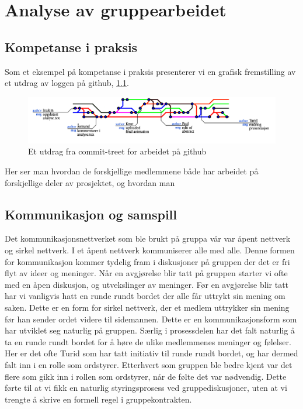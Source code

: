 
\chapter{Analyse av gruppearbeidet}

\section{Kompetanse i praksis}

Som et eksempel på kompetanse i praksis presenterer vi en grafisk fremstilling
av et utdrag av loggen på github, \cref{fig:github}.
\begin{figure}[h!]
  \begin{center}
    \includegraphics[width=\textwidth]{github.png}
  \end{center}
  \caption{Et utdrag fra commit-treet for arbeidet på github}
  \label{fig:github}
\end{figure}
Her ser man hvordan de forskjellige medlemmene både har arbeidet på forskjellige
deler av prosjektet, og hvordan man 


\section{Kommunikasjon og samspill}
Det kommunikasjonsnettverket som ble brukt på gruppa vår var åpent nettverk og sirkel nettverk. 
I et åpent nettverk kommuniserer alle med alle. Denne formen for kommunikasjon kommer tydelig fram 
i diskusjoner på gruppen der det er fri flyt av ideer og meninger. Når en avgjørelse blir tatt på 
gruppen starter vi ofte med en åpen diskusjon, og utvekslinger av meninger. Før en avgjørelse blir 
tatt har vi vanligvis hatt en runde rundt bordet der alle får uttrykt sin mening om saken. Dette er 
en form for sirkel nettverk, der et medlem uttrykker sin mening før han sender ordet videre til sidemannen.
 Dette er en kommunikasjonsform som har utviklet seg naturlig på gruppen. Særlig i prosessdelen har 
 det falt naturlig å ta en runde rundt bordet for å høre de ulike medlemmenes meninger og følelser. 
 Her er det ofte Turid som har tatt initiativ til runde rundt bordet, og har dermed falt inn i en 
 rolle som ordstyrer. Etterhvert som gruppen ble bedre kjent var det flere som gikk inn i rollen 
 som ordstyrer, når de følte det var nødvendig. Dette førte til at vi fikk en naturlig styringsprosess
  ved gruppediskusjoner, uten at vi trengte å skrive en formell regel i gruppekontrakten.\\

